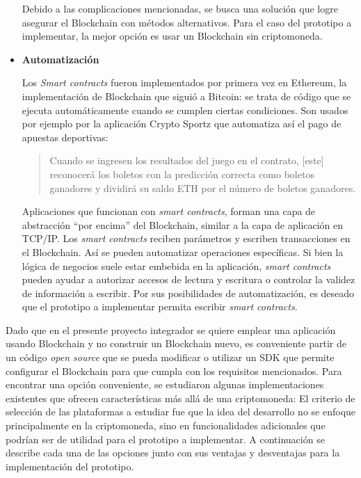 \begin{itemize}
Debido a las complicaciones mencionadas, se busca una solución que logre asegurar el Blockchain con métodos alternativos. Para el caso del prototipo a implementar, la mejor opción es usar un Blockchain sin criptomoneda.

\item \textbf{Automatización}
			 	 	
Los \textit{Smart contracts} fueron implementados por primera vez en Ethereum, la implementación de Blockchain que siguió a Bitcoin: se trata de código que se ejecuta automáticamente cuando se cumplen ciertas condiciones. Son usados por ejemplo por la aplicación Crypto Sportz que automatiza así el pago de apuestas deportivas:
\begin{quote}
Cuando se ingresen los resultados del juego en el contrato, [este] reconocerá los boletos con la predicción correcta como boletos ganadores y dividirá su saldo ETH por el número de boletos ganadores.\cite{crypto_sportz}
\end{quote}
Aplicaciones que funcionan con \textit{smart contracts}, forman una capa de abstracción ``por encima'' del Blockchain, similar a la capa de aplicación en TCP/IP. Los \textit{smart contracts} reciben parámetros y escriben transacciones en el Blockchain. Así se pueden automatizar operaciones específicas.
Si bien la lógica de negocios suele estar embebida en la aplicación, \textit{smart contracts} pueden ayudar a autorizar accesos de lectura y escritura o controlar la validez de información a escribir. Por sus posibilidades de automatización, es deseado que el prototipo a implementar permita escribir \textit{smart contracts}.
\end{itemize}

Dado que en el presente proyecto integrador se quiere emplear una aplicación usando Blockchain y no construir un Blockchain nuevo, es conveniente partir de un código \textit{open source} que se pueda modificar o utilizar un SDK que permite configurar el Blockchain para que cumpla con los requisitos mencionados. Para encontrar una opción conveniente, se estudiaron algunas implementaciones existentes que ofrecen características más allá de una criptomoneda: El criterio de selección de las plataformas a estudiar fue que la idea del desarrollo no se enfoque principalmente en la criptomoneda, sino en funcionalidades adicionales que podrían ser de utilidad para el prototipo a implementar. A continuación se describe cada una de las opciones junto con sus ventajas y desventajas para la implementación del prototipo.

